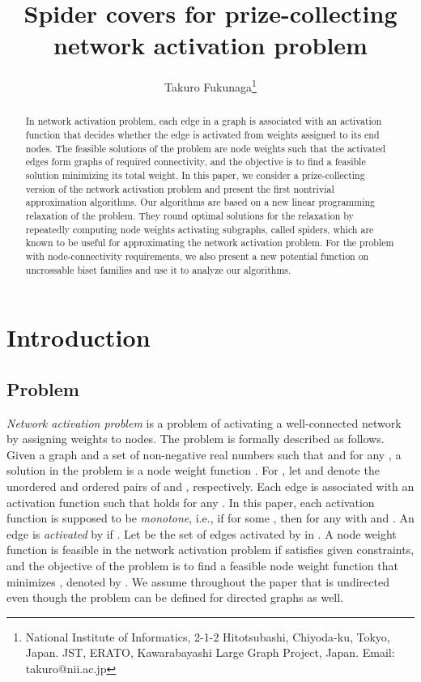 \documentclass[11pt]{article}
\title{Spider covers for prize-collecting network activation problem}
\author{Takuro Fukunaga\footnote{National Institute of Informatics,
2-1-2 Hitotsubashi, Chiyoda-ku, Tokyo, Japan.
JST, ERATO, Kawarabayashi Large Graph Project, Japan.
Email: takuro@nii.ac.jp}}
\date{}
\begin{document}
\maketitle
\begin{abstract}
In network activation problem, each edge in a graph is associated with an
 activation function that decides 
 whether the edge is activated from weights assigned
 to its end nodes.
 The feasible solutions of the problem are node weights such that the
 activated edges form graphs of required connectivity,
 and the objective is to find a feasible solution minimizing its total
 weight.
 In this paper, we consider a prize-collecting version of the network
 activation problem and present the first nontrivial approximation algorithms.
 Our algorithms are based on a new linear programming relaxation of the problem.
 They round optimal solutions for the relaxation by repeatedly computing
 node weights
 activating subgraphs, called spiders, which are known to be useful for
 approximating the network activation problem.
 For the problem with node-connectivity requirements, we also present a new
 potential function on uncrossable biset families
 and use it to analyze our algorithms.
\end{abstract}

\section{Introduction}
\subsection{Problem}
{\em Network activation problem}
is a problem of 
activating a well-connected network by assigning weights to
nodes.
The problem is formally described as follows. Given a graph  and
a set  of non-negative real numbers such that  and
 for any ,
a solution in the problem is a
node weight function .
For ,
let  and  
denote the unordered and ordered pairs of  and , respectively.
Each edge  is associated with an activation function  such that
 holds for any .
In this paper, each activation function  is supposed to be
{\em monotone}, i.e.,
if  for some ,
then  for any  with  and .
An edge  is \emph{activated} by  if
.
Let  be the set of edges activated by  in .
A node weight function  is feasible 
in the network activation problem
if  satisfies given constraints, and the objective of the problem is to find a feasible
node weight function  that minimizes , denoted by
. 
We assume throughout the paper that  is undirected even though
the problem can be defined for directed graphs as well.
\end{document}

